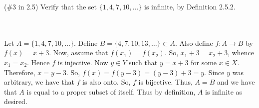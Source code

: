 (\#3 in 2.5) Verify that the set $\{1,4,7,10,\ldots\}$ is infinite, by Definition 2.5.2.\\\\

\begin{solution}\renewcommand{\qedsymbol}{}\ \\
    Let $A=\{1,4,7,10,\ldots\}$. Define $B=\{4,7,10,13,\ldots\}\subset A$. Also define
    $f:A\rightarrow B$ by $f(x)=x+3$. Now, assume that $f(x_1)=f(x_2)$. So, $x_1+3=x_2+3$, whence
    $x_1=x_2$. Hence $f$ is injective. Now $y\in Y$ such that $y=x+3$ for some $x\in X$. Therefore,
    $x=y-3$. So, $f(x)=f(y-3)=(y-3)+3=y$. Since $y$ was arbitrary, we have that $f$ is also onto. So,
    $f$ is bijective. Thus, $A=B$ and we have that $A$ is equal to a proper subset of itself. Thus by
    definition, $A$ is infinite as desired.

\end{solution}